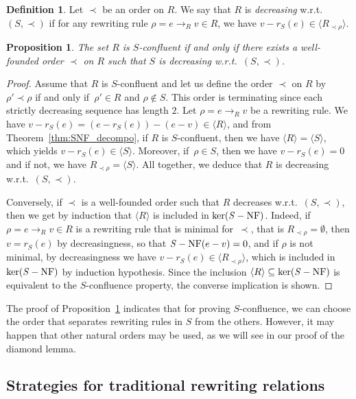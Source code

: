 \documentclass[11pt]{article}
\newtheorem{proposition}[theorem]{Proposition}
\theoremstyle{definition}
\newtheorem{definition}[theorem]{Definition}
\newcommand\wrt{w.r.t.}
\newcommand\Rrho{R_{\prec\rho}}
\newcommand\Span[1]{\langle #1\rangle}
\newcommand\rewR{\to_R}
\DeclareMathOperator{\SNF}{{\it S}-NF}
\begin{document}
\begin{definition}
  Let $\prec$ be an order on $R$. We say that $R$ is {\em decreasing}
  \wrt\ $(S,\prec)$ if for any rewriting rule $\rho=e\rewR v \in R$, we 
  have $v-r_S(e)\in\Span{\Rrho}$.
\end{definition}
\smallskip

\begin{proposition}\label{prop:decreasing}
  The set $R$ is $S$-confluent if and only if there exists a well-founded
  order $\prec$ on $R$ such that $S$ is decreasing \wrt\ $(S,\prec)$.
\end{proposition}

\begin{proof}
  Assume that $R$ is $S$-confluent and let us define the order $\prec$ on
  $R$ by $\rho'\prec\rho$ if and only if~$\rho'\in R$ and $\rho\notin S$.
  This order is terminating since each strictly decreasing sequence has
  length $2$. Let $\rho=e\rewR v$ be a rewriting rule. We have
  $v-r_S(e)=(e-r_S(e))-(e-v)\in\Span{R}$, and from
  Theorem~\ref{thm:SNF_decompo}, if $R$ is $S$-confluent, then we have
  $\Span{R}=\Span{S}$, which yields $v-r_S(e)\in\Span{S}$. Moreover, 
  if~$\rho\in S$, then we have $v-r_S(e)=0$ and if not, we have
  $\Rrho=\Span{S}$. All together, we deduce that $R$ is decreasing \wrt\
  $(S,\prec)$.
  \smallskip
  
  Conversely, if $\prec$ is a well-founded order such that $R$ decreases
  \wrt\ $(S,\prec)$, then we get by induction that $\Span{R}$ is included
  in $\ker(\SNF)$. Indeed, if $\rho=e\rewR v\in R$ is a rewriting rule
  that is minimal for~$\prec$, that is $\Rrho=\emptyset$, then $v=r_S(e)$
  by decreasingness, so that $\SNF(e-v)=0$, and if $\rho$ is not minimal,
  by decreasingness we have $v-r_S(e)\in\Span{\Rrho}$, which is included
  in $\ker(\SNF)$ by induction hypothesis. Since the inclusion
  $\Span{R}\subseteq\ker(\SNF)$ is equivalent to the $S$-confluence
  property, the converse implication is shown.
\end{proof}
\smallskip

The proof of Proposition~\ref{prop:decreasing} indicates that for proving
$S$-confluence, we can choose the order that separates rewriting rules in
$S$ from the others. However, it may happen that other natural orders may
be used, as we will see in our proof of the diamond lemma.

\subsection{Strategies for traditional rewriting relations}
\label{sec:strategies_for_traditional_rewriting_relations}
\end{document}

